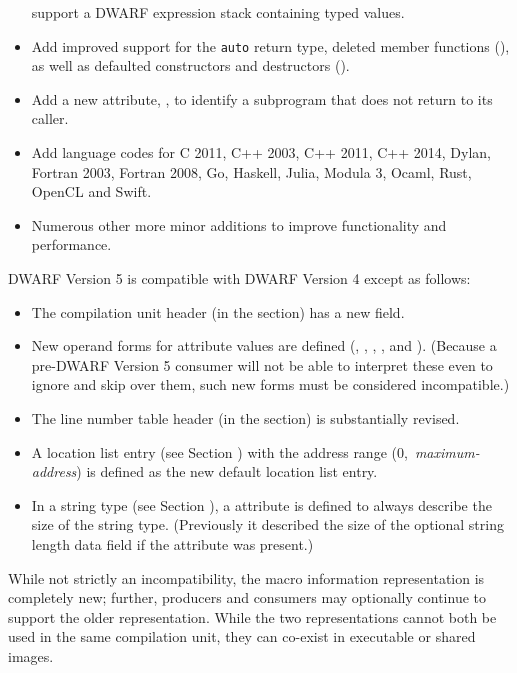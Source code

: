 \begin{itemize}
support a DWARF expression stack containing typed values.
\item Add improved support for the  \texttt{auto}
return type, deleted member functions (\DWATdeletedNAME), as well as defaulted 
constructors and destructors (\DWATdefaultedNAME).
\item Add a new attribute, \DWATnoreturnNAME{}, to identify 
a subprogram that does not return to its caller.
\item Add language codes for C 2011, C++ 2003, C++ 2011, C++ 2014,
Dylan, Fortran 2003, Fortran 2008, Go, Haskell, 
Julia, Modula 3, Ocaml, Rust, OpenCL and Swift.
\item Numerous other more minor additions to improve functionality
and performance.
\end{itemize}

DWARF Version 5 is compatible with DWARF Version 4 except as follows:
\begin{itemize}
\item The compilation unit header (in the \dotdebuginfo{} section) has
a new \HFNunittype{} field.
\item New operand forms for attribute values are defined 
(\DWFORMaddrxNAME, \DWFORMdatasixteenNAME, \DWFORMlinestrpNAME, 
\DWFORMrefsupNAME, \DWFORMstrpsupNAME{} and \DWFORMstrxNAME).
(Because a pre-DWARF Version 5 consumer will not be able to interpret 
these even to ignore and skip over them, such new forms must be 
considered incompatible.)
\item The line number table header (in the \dotdebugline{} section) 
is substantially revised.
\item A location list entry (see Section ) 
with the address range \mbox{(0, \textit{maximum-address})} is defined 
as the new default location list entry.
\item In a string type (see Section ), 
a \DWATbytesizeNAME{} attribute is defined to always describe the size 
of the string type. (Previously
it described the size of the optional string length data field if the 
\DWATstringlengthNAME{} attribute was present.)
\end{itemize}

While not strictly an incompatibility, the macro information 
representation is completely new; further, producers 
and consumers may optionally continue to support the older 
representation. While the two representations cannot both be 
used in the same compilation unit, they can co-exist in 
executable or shared images.

